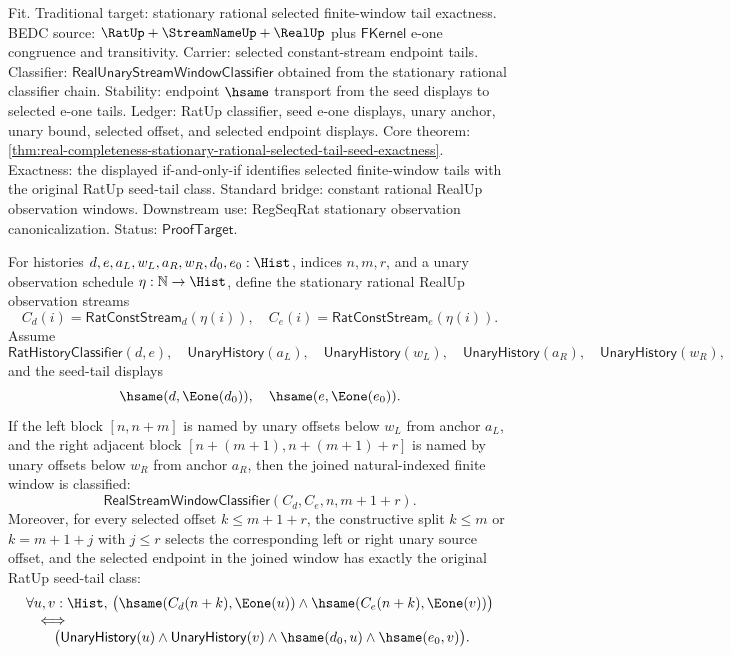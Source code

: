 Fit. Traditional target: stationary rational selected finite-window tail
exactness. BEDC source: $\RatUp+\StreamNameUp+\RealUp$ plus $\mathsf{FKernel}$
e-one congruence and transitivity. Carrier: selected constant-stream endpoint
tails. Classifier: $\mathsf{RealUnaryStreamWindowClassifier}$ obtained from the
stationary rational classifier chain. Stability: endpoint $\hsame$ transport
from the seed displays to selected e-one tails. Ledger: RatUp classifier, seed
e-one displays, unary anchor, unary bound, selected offset, and selected endpoint
displays. Core theorem:
\autoref{thm:real-completeness-stationary-rational-selected-tail-seed-exactness}.
Exactness: the displayed if-and-only-if identifies selected finite-window tails
with the original RatUp seed-tail class. Standard bridge: constant rational
RealUp observation windows. Downstream use: RegSeqRat stationary observation
canonicalization. Status: $\mathsf{ProofTarget}$.

\begin{theorem}
\label{thm:real-completeness-stationary-rational-window-concatenation}
For histories $d,e,a_L,w_L,a_R,w_R,d_0,e_0:\Hist$, indices $n,m,r$, and a
unary observation schedule $\eta:\mathbb{N}\to\Hist$, define the stationary
rational RealUp observation streams
$$
C_d(i)=\mathsf{RatConstStream}_d(\eta(i)),
\quad
C_e(i)=\mathsf{RatConstStream}_e(\eta(i)).
$$
Assume
$$
\mathsf{RatHistoryClassifier}(d,e),\quad
\mathsf{UnaryHistory}(a_L),\quad
\mathsf{UnaryHistory}(w_L),\quad
\mathsf{UnaryHistory}(a_R),\quad
\mathsf{UnaryHistory}(w_R),
$$
and the seed-tail displays
$$
\hsame(d,\Eone(d_0)),\quad
\hsame(e,\Eone(e_0)).
$$
If the left block $[n,n+m]$ is named by unary offsets below $w_L$ from anchor
$a_L$, and the right adjacent block $[n+(m+1),n+(m+1)+r]$ is named by unary
offsets below $w_R$ from anchor $a_R$, then the joined natural-indexed finite
window is classified:
$$
\mathsf{RealStreamWindowClassifier}(C_d,C_e,n,m+1+r).
$$
Moreover, for every selected offset $k\le m+1+r$, the constructive split
$k\le m$ or $k=m+1+j$ with $j\le r$ selects the corresponding left or right
unary source offset, and the selected endpoint in the joined window has exactly
the original RatUp seed-tail class:
$$
\begin{array}{l}
\forall u,v:\Hist,\,
\bigl(\hsame(C_d(n+k),\Eone(u))\land
\hsame(C_e(n+k),\Eone(v))\bigr)\\
\quad\Longleftrightarrow\\
\qquad
\bigl(\mathsf{UnaryHistory}(u)\land
\mathsf{UnaryHistory}(v)\land
\hsame(d_0,u)\land
\hsame(e_0,v)\bigr).
\end{array}
$$
\end{theorem}

